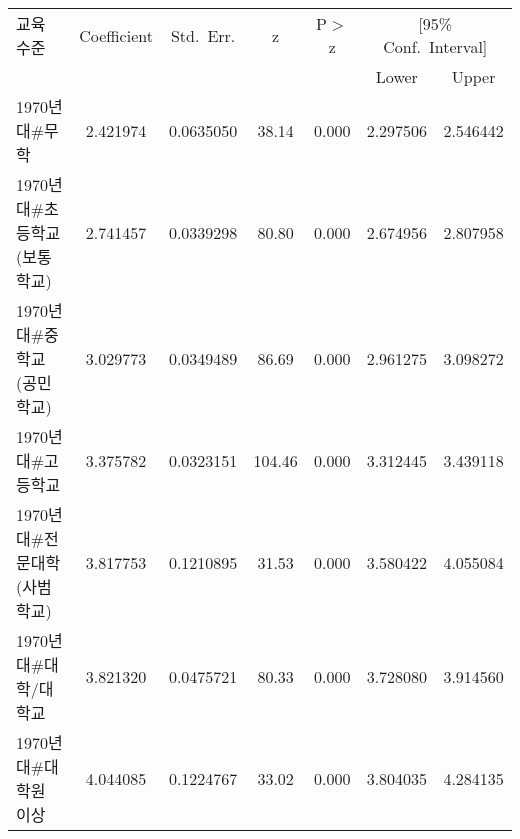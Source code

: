 \begin{tabular}{lcccccc}
\toprule
교육 수준 & Coefficient & Std.~Err. & z & P$>$z & \multicolumn{2}{c}{[95\% Conf.~Interval]} \\
\cmidrule(lr){6-7}
 &  &  &  &  & Lower & Upper \\
\midrule
1970년대\#무학 & 2.421974 & 0.0635050 & 38.14 & 0.000 & 2.297506 & 2.546442 \\
1970년대\#초등학교(보통학교) & 2.741457 & 0.0339298 & 80.80 & 0.000 & 2.674956 & 2.807958 \\
1970년대\#중학교(공민학교) & 3.029773 & 0.0349489 & 86.69 & 0.000 & 2.961275 & 3.098272 \\
1970년대\#고등학교 & 3.375782 & 0.0323151 & 104.46 & 0.000 & 3.312445 & 3.439118 \\
1970년대\#전문대학(사범학교) & 3.817753 & 0.1210895 & 31.53 & 0.000 & 3.580422 & 4.055084 \\
1970년대\#대학/대학교 & 3.821320 & 0.0475721 & 80.33 & 0.000 & 3.728080 & 3.914560 \\
1970년대\#대학원 이상 & 4.044085 & 0.1224767 & 33.02 & 0.000 & 3.804035 & 4.284135 \\
\bottomrule
\end{tabular}
